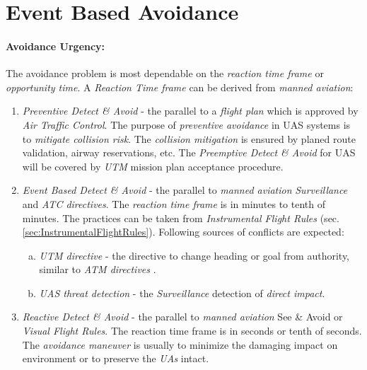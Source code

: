 \section{Event Based Avoidance}\label{sec:EventBasedAvoidance}
\paragraph{Avoidance Urgency:} The avoidance problem is most dependable on the \emph{reaction time frame} or \emph{opportunity time}. A \emph{Reaction Time frame} can be derived from \emph{manned aviation}:

\begin{enumerate}
    \item \emph{Preventive Detect \& Avoid} - the parallel to a \emph{flight plan} which is approved by \emph{Air Traffic Control}. The purpose of \emph{preventive avoidance} in UAS systems is to \emph{mitigate collision risk}. The \emph{collision mitigation} is ensured by planed route validation, airway reservations, etc. The \emph{Preemptive Detect \& Avoid} for UAS will be covered by \emph{UTM} mission plan acceptance procedure.  
    
    \item \emph{Event Based Detect \& Avoid} - the parallel to \emph{manned aviation} \emph{Surveillance} and \emph{ATC directives}. The \emph{reaction time frame} is in minutes to tenth of minutes. The practices can be taken from \emph{Instrumental Flight Rules} (sec. \ref{sec:InstrumentalFlightRules}). Following sources of conflicts are expected:
    \begin{enumerate}[a.]
        \item \emph{UTM directive} - the directive to change heading or goal from authority, similar to \emph{ATM directives} \cite{icao4444}.
        
        \item \emph{UAS threat detection} - the \emph{Surveillance} detection of \emph{direct impact}.
    \end{enumerate}
    
    \item \emph{Reactive Detect \& Avoid} - the parallel to \emph{manned aviation} See \& Avoid or \emph{Visual Flight Rules}. The reaction time frame is in seconds or tenth of seconds. The \emph{avoidance maneuver} is usually to minimize the damaging impact on environment or to preserve the \emph{UAs} intact.
\end{enumerate}

